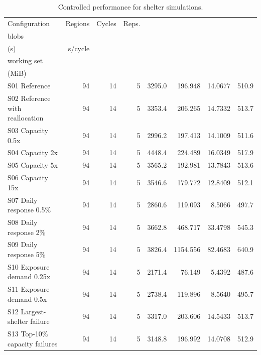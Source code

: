 \begin{table}[htbp]
\centering
\caption{Controlled performance for shelter simulations.}
\label{tab:quantitative-performance-shelter}
\begin{tabularx}{\textwidth}{@{}>{\raggedright\arraybackslash}Xrrrrrrr@{}}
\toprule
Configuration & Regions & Cycles & Reps. & \begin{tabular}[c]{@{}c@{}}Mean max.\\blobs\end{tabular} & \begin{tabular}[c]{@{}c@{}}Mean runtime\\(s)\end{tabular} & s/cycle & \begin{tabular}[c]{@{}c@{}}Mean peak\\working set\\(MiB)\end{tabular} \\
\midrule
S01 Reference & 94 & 14 & 5 & 3295.0 & 196.948 & 14.0677 & 510.9 \\
S02 Reference with reallocation & 94 & 14 & 5 & 3353.4 & 206.265 & 14.7332 & 513.7 \\
S03 Capacity 0.5x & 94 & 14 & 5 & 2996.2 & 197.413 & 14.1009 & 511.6 \\
S04 Capacity 2x & 94 & 14 & 5 & 4448.4 & 224.489 & 16.0349 & 517.9 \\
S05 Capacity 5x & 94 & 14 & 5 & 3565.2 & 192.981 & 13.7843 & 513.6 \\
S06 Capacity 15x & 94 & 14 & 5 & 3546.6 & 179.772 & 12.8409 & 512.1 \\
S07 Daily response 0.5\% & 94 & 14 & 5 & 2860.6 & 119.093 & 8.5066 & 497.7 \\
S08 Daily response 2\% & 94 & 14 & 5 & 3662.8 & 468.717 & 33.4798 & 545.3 \\
S09 Daily response 5\% & 94 & 14 & 5 & 3826.4 & 1154.556 & 82.4683 & 640.9 \\
S10 Exposure demand 0.25x & 94 & 14 & 5 & 2171.4 & 76.149 & 5.4392 & 487.6 \\
S11 Exposure demand 0.5x & 94 & 14 & 5 & 2738.4 & 119.896 & 8.5640 & 495.7 \\
S12 Largest-shelter failure & 94 & 14 & 5 & 3317.0 & 203.606 & 14.5433 & 513.7 \\
S13 Top-10\% capacity failures & 94 & 14 & 5 & 3148.8 & 196.992 & 14.0708 & 512.9 \\
\bottomrule
\end{tabularx}
\end{table}


